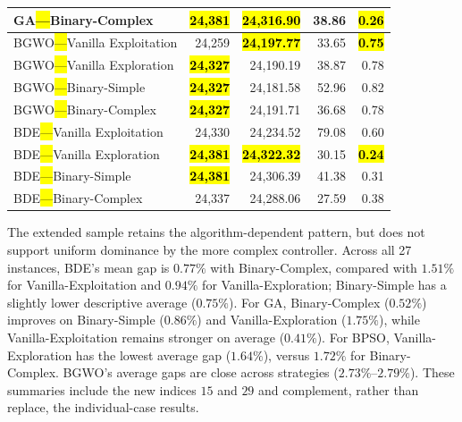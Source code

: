 \documentclass[mathematics,article,accept,moreauthors]{Definitions/mdpi}
\begin{document}
\begin{table}[H]
\begin{tabularx}{\textwidth}{lRRRR}
    GA\hl{---}Binary-Complex         & \textbf{\hl{24,381}} & \textbf{\hl{24,316.90}} &  38.86 & \textbf{\hl{0.26}} \\
    \midrule
    BGWO\hl{---}Vanilla Exploitation &          24,259 & \textbf{\hl{24,197.77}} &  33.65 & \textbf{\hl{0.75}} \\
    BGWO\hl{---}Vanilla Exploration  & \textbf{\hl{24,327}} &         24,190.19 &  38.87 &         0.78 \\
    BGWO\hl{---}Binary-Simple        & \textbf{\hl{24,327}} &         24,181.58 &  52.96 &         0.82 \\
    BGWO\hl{---}Binary-Complex       & \textbf{\hl{24,327}} &         24,191.71 &  36.68 &         0.78 \\
    \midrule
    BDE\hl{---}Vanilla Exploitation  &          24,330 &         24,234.52 &  79.08 &         0.60 \\
    BDE\hl{---}Vanilla Exploration   & \textbf{\hl{24,381}} & \textbf{\hl{24,322.32}} &  30.15 & \textbf{\hl{0.24}} \\
    BDE\hl{---}Binary-Simple         & \textbf{\hl{24,381}} &         24,306.39 &  41.38 &         0.31 \\
    BDE\hl{---}Binary-Complex        &          24,337 &         24,288.06 &  27.59 &         0.38 \\
    \bottomrule
  \end{tabularx}
\end{table}



The extended sample retains the algorithm-dependent pattern, but does not
support uniform dominance by the more complex controller. Across all 27
instances, BDE's mean gap is $0.77\%$ with Binary-Complex, compared with
$1.51\%$ for Vanilla-Exploitation and $0.94\%$ for Vanilla-Exploration;
Binary-Simple has a slightly lower descriptive average ($0.75\%$).
For GA, Binary-Complex ($0.52\%$) improves on Binary-Simple ($0.86\%$)
and Vanilla-Exploration ($1.75\%$), while Vanilla-Exploitation remains
stronger on average ($0.41\%$). For BPSO, Vanilla-Exploration has the
lowest average gap ($1.64\%$), versus $1.72\%$ for Binary-Complex.
BGWO's average gaps are close across strategies ($2.73\%$--$2.79\%$).
These summaries include the new indices $15$ and $29$ and complement,
rather than replace, the individual-case results.

\end{document}
